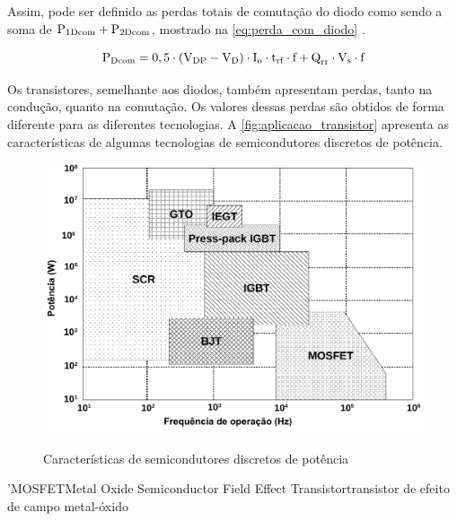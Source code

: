             Assim, pode ser definido as perdas totais de comutação do diodo como sendo a soma de $\text{P}_\text{1Dcom} + \text{P}_\text{2Dcom}$, mostrado na \autoref{eq:perda_com_diodo} \cite{ref:ELP_livro_EletrPotBarbi}.
            
            \begin{equation} \label{eq:perda_com_diodo}
                \text{P}_\text{Dcom} = 
                0,5\cdot(\text{V}_\text{DP} - \text{V}_\text{D})\cdot\text{I}_\text{o}\cdot\text{t}_\text{rf}\cdot\text{f} +
                \text{Q}_\text{rr}\cdot\text{V}_\text{s}\cdot\text{f}
            \end{equation}
            
            Os transistores, semelhante aos diodos, também apresentam perdas, tanto na condução, quanto na comutação. Os valores dessas perdas são obtidos de forma diferente para as diferentes tecnologias. A \autoref{fig:aplicacao_transistor} apresenta as características de algumas tecnologias de semicondutores discretos de potência. 
            
            \begin{figure}[H]
            	\centering
            	\caption{Características de semicondutores discretos de potência}
            	\includegraphics[scale=.9]{pdf/outros/diferenca_transistor2.pdf}
            	\label{fig:aplicacao_transistor}
            \end{figure}
            
            \abreviatura'{MOSFET}{Metal Oxide Semiconductor Field Effect Transistor}{transistor de efeito de campo metal-óxido}
            
